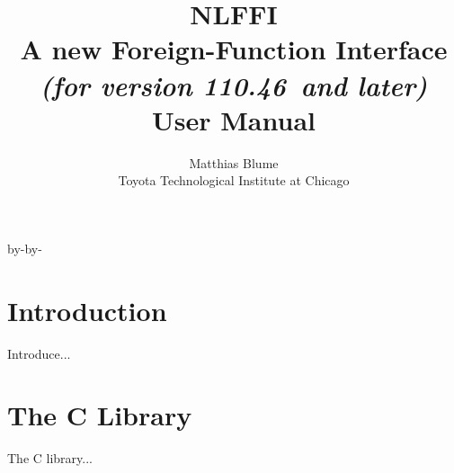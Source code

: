 \usepackage{latexsym}
\usepackage{times}

\newcommand{\cgluemaker}{{\tt c-glue-maker}}

\advance\topmargin by-\headheight\advance\topmargin by-\headsep
\textwidth6.7in

\newcommand{\smlmj}{110}
\newcommand{\smlmn}{46}

\author{Matthias Blume \\
Toyota Technological Institute at Chicago}

\title{{\bf NLFFI}\\
A new Foreign-Function Interface \\
{\it\small (for version \smlmj.\smlmn~and later)} \\
User Manual}

\setlength{\parindent}{0pt}
\setlength{\parskip}{6pt plus 3pt minus 2pt}

\newcommand{\nt}[1]{{\it #1}}
\newcommand{\tl}[1]{{\underline{\bf #1}}}
\newcommand{\ttl}[1]{{\underline{\tt #1}}}
\newcommand{\ar}{$\rightarrow$\ }
\newcommand{\vb}{~$|$~}





\maketitle

\pagebreak

\tableofcontents

\pagebreak

\section{Introduction}

Introduce...

\section{The C Library}

The C library...

